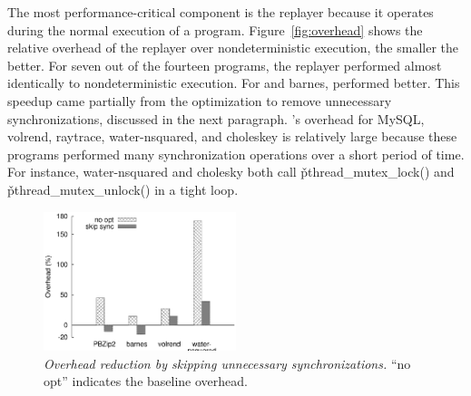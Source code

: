 
The most performance-critical component is the replayer because it
operates during the normal execution of a program.
Figure~\ref{fig:overhead} shows the relative overhead of the replayer over
nondeterministic execution, the smaller the better.  For seven out of
the fourteen programs, the replayer performed almost identically to
nondeterministic execution. For \pbzip and barnes, \tern performed
better.  This speedup came partially from the optimization to remove
unnecessary synchronizations, discussed in the next paragraph.  \tern's overhead
for MySQL, volrend, raytrace, water-nsquared, and choleskey is relatively
large because these programs performed many synchronization operations
over a short period of time.  For instance, water-nsquared and cholesky
both call \v{pthread\_mutex\_lock()} and \v{pthread\_mutex\_unlock()} in a
tight loop.



\begin{figure}[t]
\centering
\includegraphics[width=0.5\textwidth]{tern/figures/opt-overhead}
\caption{\small {\em Overhead reduction by skipping unnecessary
    synchronizations.} ``no opt'' indicates the baseline overhead.}
\label{fig:tern-opt-remove-sync}
\end{figure}

